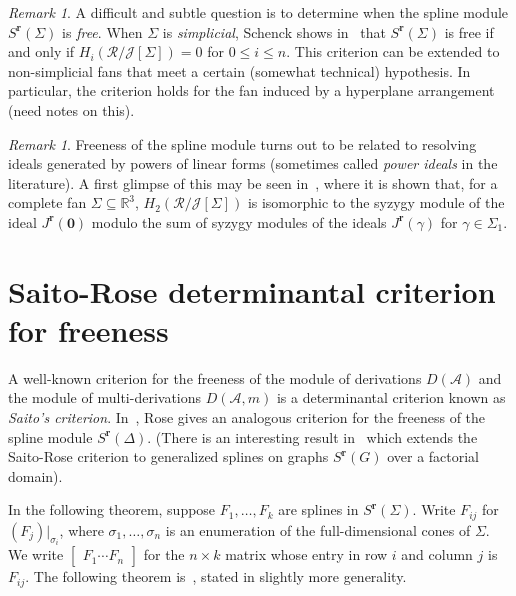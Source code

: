 \documentclass[11pt, reqno]{amsart}
\newcommand{\R}{\mathbb{R}}
\newcommand{\br}{\mathbf{r}}
\newcommand{\calJ}{\mathcal{J}}
\newcommand{\calR}{\mathcal{R}}
\newcommand{\A}{\mathcal{A}}
\theoremstyle{definition}
\theoremstyle{remark}
\newtheorem{remark}[theorem]{Remark}
\numberwithin{equation}{section}
\begin{document}
\begin{remark}
A difficult and subtle question is to determine when the spline module $S^{\br}(\Sigma)$ is \textit{free}.  When $\Sigma$ is \textit{simplicial}, Schenck shows in~\cite{Spect} that $S^{\br}(\Sigma)$ is free if and only if $H_i(\calR/\calJ[\Sigma])=0$ for $0\le i\le n$.  This criterion can be extended to non-simplicial fans that meet a certain (somewhat technical) hypothesis.  In particular, the criterion holds for the fan induced by a hyperplane arrangement (need notes on this).
\end{remark}

\begin{remark}
Freeness of the spline module turns out to be related to resolving ideals generated by powers of linear forms (sometimes called \textit{power ideals} in the literature).  A first glimpse of this may be seen in~\cite[Lemma~9.12]{AssHom}, where it is shown that, for a complete fan $\Sigma\subseteq \R^3$, $H_2(\calR/\calJ[\Sigma])$ is isomorphic to the syzygy module of the ideal $J^{\br}(\mathbf{0})$ modulo the sum of syzygy modules of the ideals $J^{\br}(\gamma)$ for $\gamma\in \Sigma_1$.
\end{remark}

\section{Saito-Rose determinantal criterion for freeness}

A well-known criterion for the freeness of the module of derivations $D(\A)$ and the module of multi-derivations $D(\A,m)$ is a determinantal criterion known as \textit{Saito's criterion}.  In~\cite{Rose-Module-Bases}, Rose gives an analogous criterion for the freeness of the spline module $S^{\br}(\Delta)$.  (There is an interesting result in~\cite{Samet-Basis-2024} which extends the Saito-Rose criterion to generalized splines on graphs $S^{\br}(G)$ over a factorial domain).

In the following theorem, suppose $F_1,\ldots,F_k$ are splines in $S^{\br}(\Sigma)$.  Write $F_{ij}$ for $(F_j)|_{\sigma_i}$, where $\sigma_1,\ldots,\sigma_n$ is an enumeration of the full-dimensional cones of $\Sigma$.  We write $\begin{bmatrix} F_1 \cdots F_n\end{bmatrix}$ for the $n\times k$ matrix whose entry in row $i$ and column $j$ is $F_{ij}$.  The following theorem is~\cite[Theorem~2.3]{Rose-Module-Bases}, stated in slightly more generality.
\end{document}
